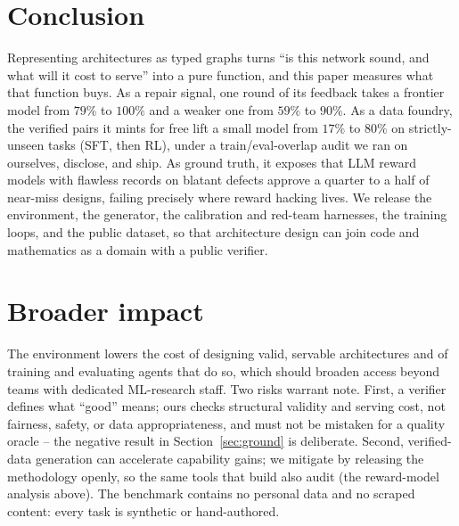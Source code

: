 \documentclass{article}
\begin{document}
\section{Conclusion}
Representing architectures as typed graphs turns ``is this network sound, and what will it cost to serve'' into a pure function, and this paper measures what that function buys. As a repair signal, one round of its feedback takes a frontier model from $79\%$ to $100\%$ and a weaker one from $59\%$ to $90\%$. As a data foundry, the verified pairs it mints for free lift a small model from $17\%$ to $80\%$ on strictly-unseen tasks (SFT, then RL), under a train/eval-overlap audit we ran on ourselves, disclose, and ship. As ground truth, it exposes that LLM reward models with flawless records on blatant defects approve a quarter to a half of near-miss designs, failing precisely where reward hacking lives. We release the environment, the generator, the calibration and red-team harnesses, the training loops, and the public dataset, so that architecture design can join code and mathematics as a domain with a public verifier.

\section*{Broader impact}
The environment lowers the cost of designing valid, servable architectures and of training and evaluating agents that do so, which should broaden access beyond teams with dedicated ML-research staff. Two risks warrant note. First, a verifier defines what ``good'' means; ours checks structural validity and serving cost, not fairness, safety, or data appropriateness, and must not be mistaken for a quality oracle -- the negative result in Section~\ref{sec:ground} is deliberate. Second, verified-data generation can accelerate capability gains; we mitigate by releasing the methodology openly, so the same tools that build also audit (the reward-model analysis above). The benchmark contains no personal data and no scraped content: every task is synthetic or hand-authored.
\end{document}
